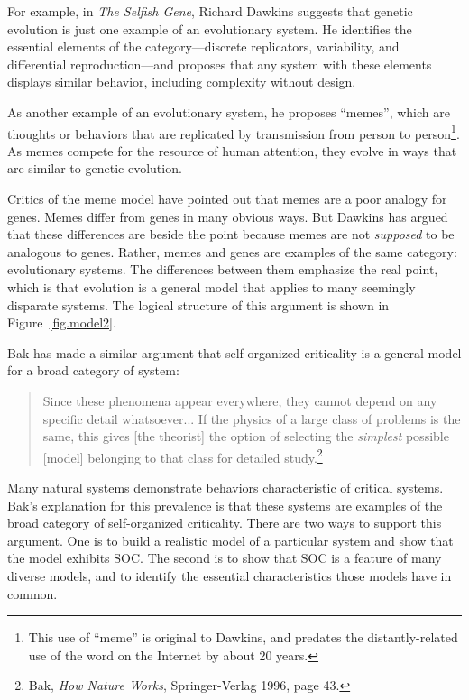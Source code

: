\documentclass[12pt]{book}
\theoremstyle{exercise}
\begin{document}
For example, in {\em The Selfish Gene}, Richard Dawkins suggests that
genetic evolution is just one example of an evolutionary system.  He
identifies the essential elements of the category---discrete
replicators, variability, and differential reproduction---and proposes
that any system with these elements displays similar
behavior, including complexity without design.


As another example of an evolutionary system, he proposes ``memes'',
which are thoughts or behaviors that are replicated by transmission
from person to person\footnote{This use of ``meme'' is original to
  Dawkins, and predates the distantly-related use of the word on the
  Internet by about 20 years.}.  As memes compete for the resource of
human attention, they evolve in ways that are similar to genetic
evolution.


Critics of the meme model have pointed out that
memes are a poor analogy for genes.  Memes differ from genes in many
obvious ways.  But Dawkins has argued that these differences are
beside the point because memes are not {\em supposed} to be analogous
to genes.  Rather, memes and genes are examples of the same
category: evolutionary systems.  The differences between them
emphasize the real point, which is that evolution is a general model
that applies to many seemingly disparate systems.  The logical
structure of this argument is shown in Figure~\ref{fig.model2}.


Bak has made a similar argument that self-organized criticality is a
general model for a broad category of system:

\begin{quote}
Since these phenomena appear everywhere, they cannot depend on any
specific detail whatsoever...  If the physics of a large class of
problems is the same, this gives [the theorist] the option of selecting
the {\em simplest} possible [model] belonging to that class for detailed
study.\footnote{Bak, {\em How Nature Works}, Springer-Verlag 1996, page 43.}
\end{quote}


Many natural systems demonstrate behaviors characteristic of critical
systems.  Bak's explanation for this prevalence is that these systems
are examples of the broad category of self-organized criticality.
There are two ways to support this argument.  One is to build
a realistic model of a particular system and show that the model
exhibits SOC.  The second is to show that SOC is a feature of many
diverse models, and to identify the essential characteristics
those models have in common.
\end{document}
